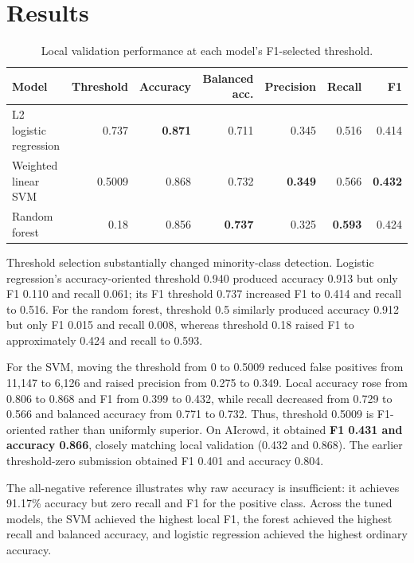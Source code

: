 \documentclass[10pt,a4paper]{article}
\begin{document}
\newpage

\section{Results}

\begin{table}[h]
\centering
\small
\caption{Local validation performance at each model's F1-selected threshold.}
\label{tab:comparison}
\begin{tabular}{lrrrrrr}
\toprule
Model & Threshold & Accuracy & Balanced acc. & Precision & Recall & F1 \\
\midrule
L2 logistic regression & 0.737 & \textbf{0.871} & 0.711 & 0.345 & 0.516 & 0.414 \\
Weighted linear SVM & 0.5009 & 0.868 & 0.732 & \textbf{0.349} & 0.566 & \textbf{0.432} \\
Random forest & 0.18 & 0.856 & \textbf{0.737} & 0.325 & \textbf{0.593} & 0.424 \\
\bottomrule
\end{tabular}
\end{table}

Threshold selection substantially changed minority-class detection. Logistic
regression's accuracy-oriented threshold 0.940 produced accuracy 0.913 but only
F1 0.110 and recall 0.061; its F1 threshold 0.737 increased F1 to 0.414 and
recall to 0.516. For the random forest, threshold 0.5 similarly produced
accuracy 0.912 but only F1 0.015 and recall 0.008, whereas threshold 0.18 raised
F1 to approximately 0.424 and recall to 0.593.

For the SVM, moving the threshold from 0 to 0.5009 reduced false positives from
11,147 to 6,126 and raised precision from 0.275 to 0.349. Local accuracy rose
from 0.806 to 0.868 and F1 from 0.399 to 0.432, while recall decreased from
0.729 to 0.566 and balanced accuracy from 0.771 to 0.732. Thus, threshold 0.5009
is F1-oriented rather than uniformly superior. On AIcrowd, it obtained
\textbf{F1 0.431 and accuracy 0.866}, closely matching local validation
(0.432 and 0.868). The earlier threshold-zero submission obtained F1 0.401 and
accuracy 0.804.

The all-negative reference illustrates why raw accuracy is insufficient: it
achieves 91.17\% accuracy but zero recall and F1 for the positive class. Across
the tuned models, the SVM achieved the highest local F1, the forest achieved
the highest recall and balanced accuracy, and logistic regression achieved the
highest ordinary accuracy.
\end{document}
